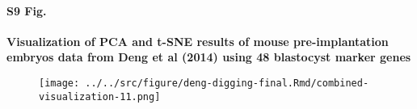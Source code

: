 \documentclass[10pt,letterpaper]{article}
\begin{document}
\paragraph*{S9 Fig.}

\label{figS9}
{\bf Visualization of PCA and t-SNE results of mouse pre-implantation embryos data from Deng et al (2014) using 48 blastocyst marker genes}
\begin{figure}[ht]
\centering
\texttt{[image: ../../src/figure/deng-digging-final.Rmd/combined-visualization-11.png]}
\end{figure}
\end{document}
